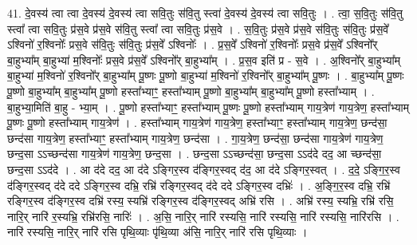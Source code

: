 \documentclass[17pt]{extarticle}
\begin{document}
41. दे॒वस्य॑ त्वा त्वा दे॒वस्य॑ दे॒वस्य॑ त्वा सवि॒तुः स॑वि॒तु स्त्वा॑ दे॒वस्य॑ दे॒वस्य॑ त्वा सवि॒तुः । . त्वा॒ स॒वि॒तुः स॑वि॒तु स्त्वा᳚ त्वा सवि॒तुः प्र॑स॒वे प्र॑स॒वे स॑वि॒तु स्त्वा᳚ त्वा सवि॒तुः प्र॑स॒वे । . स॒वि॒तुः प्र॑स॒वे प्र॑स॒वे स॑वि॒तुः स॑वि॒तुः प्र॑स॒वे᳚ ऽश्विनो॑ र॒श्विनोः᳚ प्रस॒वे स॑वि॒तुः स॑वि॒तुः प्र॑स॒वे᳚ ऽश्विनोः᳚ । . प्र॒स॒वे᳚ ऽश्विनो॑ र॒श्विनोः᳚ प्रस॒वे प्र॑स॒वे᳚ ऽश्विनो᳚र् बा॒हुभ्या᳚म् बा॒हुभ्या॑ म॒श्विनोः᳚ प्रस॒वे प्र॑स॒वे᳚ ऽश्विनो᳚र् बा॒हुभ्या᳚म् । . प्र॒स॒व इति॑ प्र - स॒वे । . अ॒श्विनो᳚र् बा॒हुभ्या᳚म् बा॒हुभ्या॑ म॒श्विनो॑ र॒श्विनो᳚र् बा॒हुभ्या᳚म् पू॒ष्णः पू॒ष्णो बा॒हुभ्या॑ म॒श्विनो॑ र॒श्विनो᳚र् बा॒हुभ्या᳚म् पू॒ष्णः । . बा॒हुभ्या᳚म् पू॒ष्णः पू॒ष्णो बा॒हुभ्या᳚म् बा॒हुभ्या᳚म् पू॒ष्णो हस्ता᳚भ्याꣳ॒॒ हस्ता᳚भ्याम् पू॒ष्णो बा॒हुभ्या᳚म् बा॒हुभ्या᳚म् पू॒ष्णो हस्ता᳚भ्याम् । . बा॒हुभ्या॒मिति॑ बा॒हु - भ्या॒म् । . पू॒ष्णो हस्ता᳚भ्याꣳ॒॒ हस्ता᳚भ्याम् पू॒ष्णः पू॒ष्णो हस्ता᳚भ्याम् गाय॒त्रेण॑ गाय॒त्रेण॒ हस्ता᳚भ्याम् पू॒ष्णः पू॒ष्णो हस्ता᳚भ्याम् गाय॒त्रेण॑ । . हस्ता᳚भ्याम् गाय॒त्रेण॑ गाय॒त्रेण॒ हस्ता᳚भ्याꣳ॒॒ हस्ता᳚भ्याम् गाय॒त्रेण॒ छन्द॑सा॒ छन्द॑सा गाय॒त्रेण॒ हस्ता᳚भ्याꣳ॒॒ हस्ता᳚भ्याम् गाय॒त्रेण॒ छन्द॑सा । . गा॒य॒त्रेण॒ छन्द॑सा॒ छन्द॑सा गाय॒त्रेण॑ गाय॒त्रेण॒ छन्द॒सा ऽऽच्छन्द॑सा गाय॒त्रेण॑ गाय॒त्रेण॒ छन्द॒सा । . छन्द॒सा ऽऽच्छन्द॑सा॒ छन्द॒सा ऽऽद॑दे दद॒ आ च्छन्द॑सा॒ छन्द॒सा ऽऽद॑दे । . आ द॑दे दद॒ आ द॑दे ऽङ्गिर॒स्व द॑ङ्गिर॒स्वद् द॑द॒ आ द॑दे ऽङ्गिर॒स्वत् । . द॒दे॒ ऽङ्गि॒र॒स्व द॑ङ्गिर॒स्वद् द॑दे ददे ऽङ्गिर॒स्व दभ्रि॒ रभ्रि॑ रङ्गिर॒स्वद् द॑दे ददे ऽङ्गिर॒स्व दभ्रिः॑ । . अ॒ङ्गि॒र॒स्व दभ्रि॒ रभ्रि॑ रङ्गिर॒स्व द॑ङ्गिर॒स्व दभ्रि॑ रस्य॒ स्यभ्रि॑ रङ्गिर॒स्व द॑ङ्गिर॒स्वद् अभ्रि॑ रसि । . अभ्रि॑ रस्य॒ स्यभ्रि॒ रभ्रि॑ रसि॒ नारि॒र् नारि॑ र॒स्यभ्रि॒ रभ्रि॑रसि॒ नारिः॑ । . अ॒सि॒ नारि॒र् नारि॑ रस्यसि॒ नारि॑ रस्यसि॒ नारि॑ रस्यसि॒ नारि॑रसि । . नारि॑ रस्यसि॒ नारि॒र् नारि॑ रसि पृथि॒व्याः पृ॑थि॒व्या अ॑सि॒ नारि॒र् नारि॑ रसि पृथि॒व्याः । \newline
\pagebreak
{}
\end{document}
